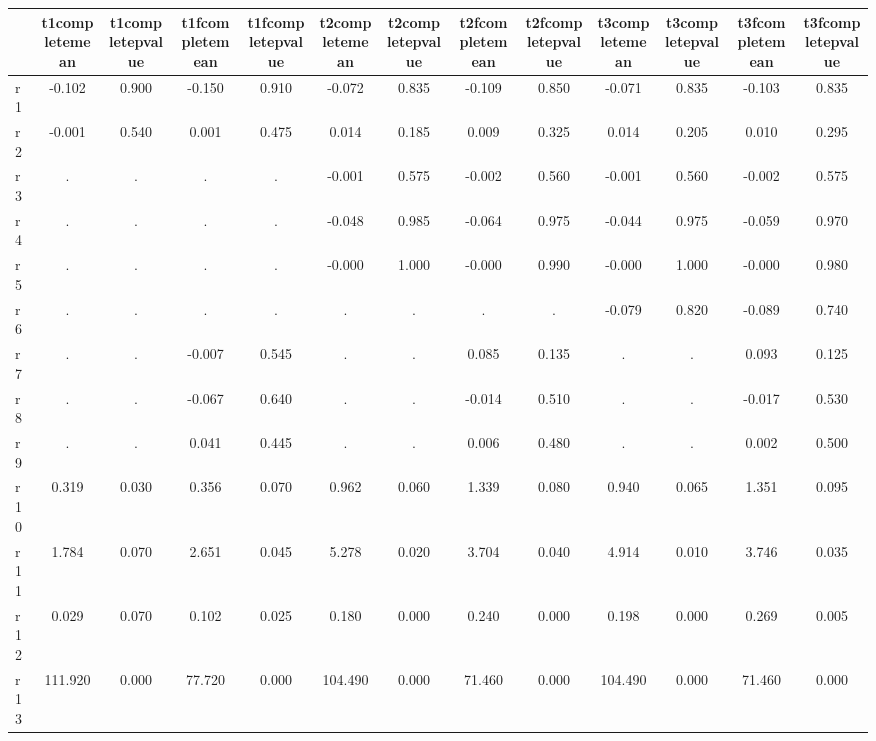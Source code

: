 \begin{table}[htbp]
\begin{tabular}{lcccccccccccc} \hline \hline
 & t1completemean  & t1completepvalue  & t1fcompletemean  & t1fcompletepvalue  & t2completemean  & t2completepvalue  & t2fcompletemean  & t2fcompletepvalue  & t3completemean  & t3completepvalue  & t3fcompletemean  & t3fcompletepvalue  \\  \hline 
r1 &    -0.102 &     0.900 &    -0.150 &     0.910 &    -0.072 &     0.835 &    -0.109 &     0.850 &    -0.071 &     0.835 &    -0.103 &     0.835 \\  
r2 &    -0.001 &     0.540 &     0.001 &     0.475 &     0.014 &     0.185 &     0.009 &     0.325 &     0.014 &     0.205 &     0.010 &     0.295 \\  
r3 &         . &         . &         . &         . &    -0.001 &     0.575 &    -0.002 &     0.560 &    -0.001 &     0.560 &    -0.002 &     0.575 \\  
r4 &         . &         . &         . &         . &    -0.048 &     0.985 &    -0.064 &     0.975 &    -0.044 &     0.975 &    -0.059 &     0.970 \\  
r5 &         . &         . &         . &         . &    -0.000 &     1.000 &    -0.000 &     0.990 &    -0.000 &     1.000 &    -0.000 &     0.980 \\  
r6 &         . &         . &         . &         . &         . &         . &         . &         . &    -0.079 &     0.820 &    -0.089 &     0.740 \\  
r7 &         . &         . &    -0.007 &     0.545 &         . &         . &     0.085 &     0.135 &         . &         . &     0.093 &     0.125 \\  
r8 &         . &         . &    -0.067 &     0.640 &         . &         . &    -0.014 &     0.510 &         . &         . &    -0.017 &     0.530 \\  
r9 &         . &         . &     0.041 &     0.445 &         . &         . &     0.006 &     0.480 &         . &         . &     0.002 &     0.500 \\  
r10 &     0.319 &     0.030 &     0.356 &     0.070 &     0.962 &     0.060 &     1.339 &     0.080 &     0.940 &     0.065 &     1.351 &     0.095 \\  
r11 &     1.784 &     0.070 &     2.651 &     0.045 &     5.278 &     0.020 &     3.704 &     0.040 &     4.914 &     0.010 &     3.746 &     0.035 \\  
r12 &     0.029 &     0.070 &     0.102 &     0.025 &     0.180 &     0.000 &     0.240 &     0.000 &     0.198 &     0.000 &     0.269 &     0.005 \\  
r13 &   111.920 &     0.000 &    77.720 &     0.000 &   104.490 &     0.000 &    71.460 &     0.000 &   104.490 &     0.000 &    71.460 &     0.000 \\  
\hline \hline \end{tabular}
\end{table}
